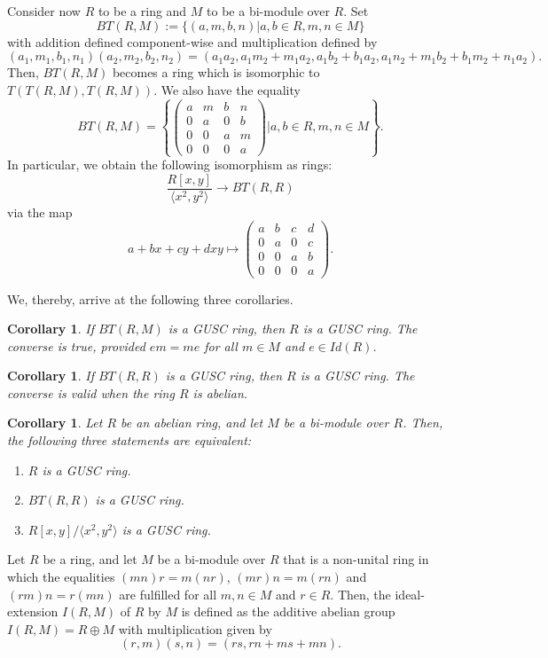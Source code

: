 \documentclass[12pt]{amsart}
\newtheorem{corollary}[theorem]{Corollary}
\theoremstyle{definition}
\begin{document}
Consider now $R$ to be a ring and $M$ to be a bi-module over $R$. Set $$BT(R,M) := \{ (a, m, b, n) | a, b \in R, m, n \in M \}$$ with addition defined component-wise and multiplication defined by $$(a_1, m_1, b_1, n_1)(a_2, m_2, b_2, n_2) = (a_1a_2, a_1m_2 + m_1a_2, a_1b_2 + b_1a_2, a_1n_2 + m_1b_2 + b_1m_2 +n_1a_2).$$ Then, $BT(R,M)$ becomes a ring which is isomorphic to $T(T(R, M), T(R, M))$. We also have the equality $$BT(R, M) =
\left\{\begin{pmatrix}
	a &m &b &n\\
	0 &a &0 &b\\
	0 &0 &a &m\\
	0 &0 &0 &a
\end{pmatrix} |  a,b \in R, m,n \in M\right\}.$$ In particular, we obtain the following isomorphism as rings: $$\dfrac{R[x, y]}{\langle x^2, y^2\rangle} \rightarrow BT(R, R)$$ via the map $$a + bx + cy + dxy \mapsto
\begin{pmatrix}
	a &b &c &d\\
	0 &a &0 &c\\
	0 &0 &a &b\\
	0 &0 &0 &a
\end{pmatrix}.$$

We, thereby, arrive at the following three corollaries.

\begin{corollary}
If $BT(R,M)$ is a GUSC ring, then $R$ is a GUSC ring. The converse is true, provided $em=me$ for all $m\in M$ and $e\in Id(R)$.
\end{corollary}

\begin{corollary}
If $BT(R,R)$ is a GUSC ring, then $R$ is a GUSC ring. The converse is valid when the ring $R$ is abelian.
\end{corollary}

\begin{corollary}
Let $R$ be an abelian ring, and let $M$ be a bi-module over $R$. Then, the following three statements are equivalent:
\begin{enumerate}
\item
$R$ is a GUSC ring.
\item
$BT(R, R)$ is a GUSC ring.
\item
$R[x, y]/\langle x^2, y^2\rangle$ is a GUSC ring.
\end{enumerate}
\end{corollary}

Let $R$ be a ring, and let $M$ be a bi-module over $R$ that is a non-unital ring in which the equalities $(mn)r=m(nr)$, $(mr)n=m(rn)$ and $(rm)n=r(mn)$ are fulfilled for all $m,n\in M$ and $r\in R$. Then, the ideal-extension $I(R,M)$ of $R$ by $M$ is defined as the additive abelian group $I(R,M)=R\oplus M$ with multiplication given by $$(r,m)(s,n)=(rs, rn+ms+mn).$$
\end{document}
